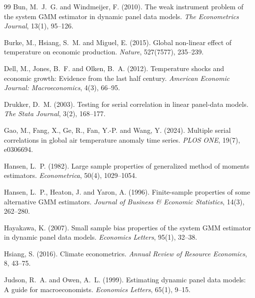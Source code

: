 \documentclass[11pt,a4paper]{article}
\begin{document}
\begin{thebibliography}{99}
Bun, M.~J.~G. and Windmeijer, F. (2010). The weak instrument problem of the system GMM estimator in dynamic panel data models. \emph{The Econometrics Journal}, 13(1), 95--126. 

Burke, M., Hsiang, S.~M. and Miguel, E. (2015). Global non-linear effect of temperature on economic production. \emph{Nature}, 527(7577), 235--239. 

Dell, M., Jones, B.~F. and Olken, B.~A. (2012). Temperature shocks and economic growth: Evidence from the last half century. \emph{American Economic Journal: Macroeconomics}, 4(3), 66--95. 

Drukker, D.~M. (2003). Testing for serial correlation in linear panel-data models. \emph{The Stata Journal}, 3(2), 168--177. 

Gao, M., Fang, X., Ge, R., Fan, Y.-P. and Wang, Y. (2024). Multiple serial correlations in global air temperature anomaly time series. \emph{PLOS ONE}, 19(7), e0306694. 

Hansen, L.~P. (1982). Large sample properties of generalized method of moments estimators. \emph{Econometrica}, 50(4), 1029--1054. 

Hansen, L.~P., Heaton, J. and Yaron, A. (1996). Finite-sample properties of some alternative GMM estimators. \emph{Journal of Business \& Economic Statistics}, 14(3), 262--280. 

Hayakawa, K. (2007). Small sample bias properties of the system GMM estimator in dynamic panel data models. \emph{Economics Letters}, 95(1), 32--38. 

Hsiang, S. (2016). Climate econometrics. \emph{Annual Review of Resource Economics}, 8, 43--75. 

Judson, R.~A. and Owen, A.~L. (1999). Estimating dynamic panel data models: A guide for macroeconomists. \emph{Economics Letters}, 65(1), 9--15. 


\end{thebibliography}
\end{document}
